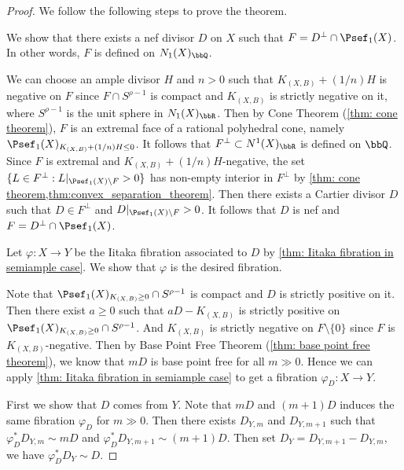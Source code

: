     \begin{proof}
        We follow the following steps to prove the theorem.
        \begin{step}\label{step:K_negative_face_is_rational_in_thm:contraction_theorem}
            We show that there exists a nef divisor \(D\) on \(X\) such that \(F = D^\perp \cap \Psef_1(X)\).
            In other words, \(F\) is defined on \(N_1(X)_\bbQ\).
        \end{step}
        We can choose an ample divisor \(H\) and \(n > 0\) such that \(K_{(X,B)}+(1/n)H\) is negative on \(F\) since \(F \cap S^{\rho-1}\) is compact and \(K_{(X,B)}\) is strictly negative on it,
        where \(S^{\rho-1}\) is the unit sphere in \(N_1(X)_\bbR\).
        Then by Cone Theorem (\cref{thm: cone theorem}), \(F\) is an extremal face of a rational polyhedral cone, namely \(\Psef_1(X)_{K_{(X,B)}+(1/n) H \leq 0}\).
        It follows that \(F^\perp \subset N^1(X)_\bbR\) is defined on \(\bbQ\).
        Since \(F\) is extremal and \(K_{(X,B)}+(1/n)H\)-negative, the set \(\{L \in F^\perp: L|_{\Psef_1(X)\setminus F}>0\}\) has non-empty interior in \(F^\perp\) by \cref{thm: cone theorem,thm:convex_separation_theorem}.
        Then there exists a Cartier divisor \(D\) such that \(D \in F^\perp\) and \(D|_{\Psef_1(X)\setminus F} > 0\).
        It follows that \(D\) is nef and \(F = D^\perp \cap \Psef_1(X)\).
        
        \begin{step}
            Let \(\varphi: X \to Y\) be the Iitaka fibration associated to \(D\) by \cref{thm: Iitaka fibration in semiample case}.
            We show that \(\varphi\) is the desired fibration.
        \end{step}
        Note that \(\Psef_1(X)_{K_{(X,B)} \geq 0} \cap S^{\rho-1}\) is compact and \(D\) is strictly positive on it.
        Then there exist \(a \geq 0\) such that \(aD - K_{(X,B)}\) is strictly positive on \(\Psef_1(X)_{K_{(X,B)} \geq 0} \cap S^{\rho-1}\).
        And \(K_{(X,B)}\) is strictly negative on \(F\setminus \{0\}\) since \(F\) is \(K_{(X,B)}\)-negative.
        Then by Base Point Free Theorem (\cref{thm: base point free theorem}), we know that \(mD\) is base point free for all \(m \gg 0\).
        Hence we can apply \cref{thm: Iitaka fibration in semiample case} to get a fibration \(\varphi_D: X \to Y\).

        First we show that \(D\) comes from \(Y\).
        Note that \(mD\) and \((m+1)D\) induces the same fibration \(\varphi_D\) for \(m \gg 0\).
        Then there exists \(D_{Y,m}\) and \(D_{Y,m+1}\) such that \(\varphi_D^* D_{Y,m} \sim mD\) and \(\varphi_D^* D_{Y,m+1} \sim (m+1)D\).
        Then set \(D_Y = D_{Y,m+1} - D_{Y,m}\), we have \(\varphi_D^* D_Y \sim D\).


\end{proof}
